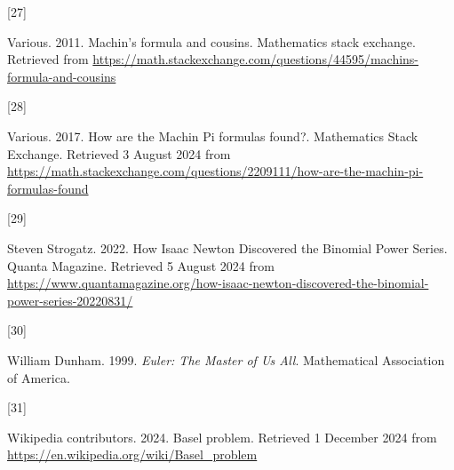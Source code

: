 \documentclass[
  a4paper,
]{article}
\newlength{\cslhangindent}
\newlength{\csllabelwidth}
\newenvironment{CSLReferences}[2] %
 {\begin{list}{}{%
  \setlength{\itemindent}{0pt}
  \setlength{\leftmargin}{0pt}
  \setlength{\parsep}{0pt}
  \ifodd #1
   \setlength{\leftmargin}{\cslhangindent}
   \setlength{\itemindent}{-1\cslhangindent}
  \fi
  \setlength{\itemsep}{#2\baselineskip}}}
 {\end{list}}
\newcommand{\CSLLeftMargin}[1]{\parbox[t]{\csllabelwidth}{\strut#1\strut}}
\newcommand{\CSLRightInline}[1]{\parbox[t]{\linewidth - \csllabelwidth}{\strut#1\strut}}
\begin{document}
\begin{CSLReferences}{0}{0}
\CSLLeftMargin{{[}27{]} }%
\CSLRightInline{Various. 2011. {Machin's formula and cousins}.
Mathematics stack exchange. Retrieved from
\url{https://math.stackexchange.com/questions/44595/machins-formula-and-cousins}}

\CSLLeftMargin{{[}28{]} }%
\CSLRightInline{Various. 2017. {How are the Machin Pi formulas found?}.
{Mathematics Stack Exchange}. Retrieved 3 August 2024 from
\url{https://math.stackexchange.com/questions/2209111/how-are-the-machin-pi-formulas-found}}

\CSLLeftMargin{{[}29{]} }%
\CSLRightInline{Steven Strogatz. 2022. {How Isaac Newton Discovered the
Binomial Power Series}. {Quanta Magazine}. Retrieved 5 August 2024 from
\url{https://www.quantamagazine.org/how-isaac-newton-discovered-the-binomial-power-series-20220831/}}

\CSLLeftMargin{{[}30{]} }%
\CSLRightInline{William Dunham. 1999. \emph{{Euler: The Master of Us
All}}. Mathematical Association of America.}

\CSLLeftMargin{{[}31{]} }%
\CSLRightInline{Wikipedia contributors. 2024. {Basel problem}. Retrieved
1 December 2024 from \url{https://en.wikipedia.org/wiki/Basel_problem}}

\end{CSLReferences}
\end{document}
